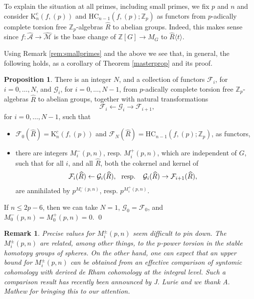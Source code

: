 \documentclass[reqno,11pt,letterpaper]{amsart}
\theoremstyle{plain}
\numberwithin{equation}{subsection}
\newtheorem{proposition}[equation]{Proposition}
\newtheorem{Remark}[equation]{Remark}
\theoremstyle{remark}
\theoremstyle{plain}
\theoremstyle{definition}\newtheorem*{notation}{Notation}
\newcommand{\calF}{{\mathcal F}}
\newcommand{\calG}{{\mathcal G}}
\newcommand{\A}{{\mathcal A}}
\newcommand{\M}{{\mathcal M}}
\newcommand{\lan}{\langle}
\newcommand{\ran}{\rangle}
\newtheorem{proposition}[theorem]{Proposition}
\newcommand{\RK}{\mathrm{K}}
\newcommand{\BZ}{\mathbb{Z}}
\newcommand{\HC}{\mathrm{HC}}
\newcommand{\wh}{\widehat}
\begin{document}
To explain the situation at all primes, including small primes, we fix $p$ and $n$ and consider $\RK^c_n(f, (p))$ and  $\HC_{n-1}(f , (p);\BZ_p)$ as functors from 
$p$-adically complete torsion free $\BZ_p$-algebras $\wh R$ to abelian groups. Indeed, this makes sense since $f: \wh \A\to \wh \M$ is the base change of $\BZ[G]\to M_G$
to $\wh R\lan t\ran$.

Using Remark \ref{rem:smallprimes} and the above we see that, in general, the following holds, as a corollary of Theorem \ref{masterprop} and its proof.

\begin{proposition}\label{prop:smallprimes} There is an integer $N$, and a collection of 
functors $\calF_i$, for $i=0,\ldots, N$, and $\calG_i$, for $i=0,\ldots, N-1$, from 
 $p$-adically complete torsion free $\BZ_p$-algebras $\wh R$ to abelian groups, together  with natural transformations 
 \[
 \calF_i\leftarrow \calG_i\to \calF_{i+1},
 \]
  for $i=0,\ldots , N-1$, such that 
 \begin{itemize}
     \item $\calF_0(\wh R )=\RK^c_n(f, (p))$ and $\calF_{N}(\wh R )=\HC_{n-1}(f , (p);\BZ_p)$, as functors,
     \item there are integers $M^-_i(p, n)$, resp. $M^+_i(p, n)$, which are independent of $G$, such that for all $i$, and all $\wh R$, both the cokernel and kernel of
     \[ 
      \calF_i(\wh R)\leftarrow \calG_i(\wh R), \ \ \hbox{\rm resp. }\ \ \calG_i(\wh R)\to \calF_{i+1}(\wh R),
     \] 
     are annihilated by $p^{M^-_i(p, n)}$, resp. $p^{M^+_i(p, n)}$.
 \end{itemize}
 If $n\leq 2p-6$, then we can take $N=1$, $\calG_0=\calF_0$, and $M^-_0(p, n)=M^+_0(p, n)=0$. \qed
 \end{proposition}
  
 
 \begin{Remark}
{\rm  Precise values for $M^\pm_i(p, n)$ seem difficult to pin down. The $M^\pm_i(p, n)$ are related, among other things, to the $p$-power torsion in the stable homotopy groups of spheres. On the other hand, one can expect that an upper bound for $M^\pm_i(p, n)$ can be obtained from an effective comparison of syntomic cohomology with derived de Rham cohomology at the integral level. Such a comparison result has recently been announced by J. Lurie and we thank A. Mathew for bringing this to our attention.}
\end{Remark}



 
\end{document}
